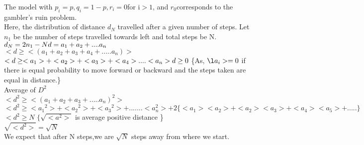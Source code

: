 \documentclass{beamer}
\providecommand{\brak}[1]{\ensuremath{\left(#1\right)}}
\providecommand{\brak}[1]{\ensuremath{\left(#1\right)}}
\begin{document}
            \begin{frame}
            The model with $ p_i=p,q_i=1-p,r_i=0 $for i$>1$, and $r_0 $corresponds to the gambler's ruin problem.\\
            
            Here, the distribution of distance $d_N$ travelled after a given number of steps. Let $n_1 $ be the number 
             of steps travelled towards left and total steps be N.\\
             $d_N=2n_1-N   \\
             d=a_1 +a_2 +....a_n $\\
             $<d \ge  < \brak {a_1 +a_2 +a_3 +a_4 +.....a_n}> $\\
            $ <d\ge   <a_1>+<a_2>+<a_3>+<a_4>....<a_n>\\
              d \ge 0  $ \hspace \{As, $ \l a_i>=0$ if there is equal probability to move forward or backward and the steps taken are equal in distance.\}\\
             Average of $D^2 $\\
             $<d^2\ge <\brak{ a_1+a_2+a_3+.....a_n  }^2> $\\
            $ <d^2\ge <{a_1}^2>+<{a_2}^2>+<{a_3}^2>+.......<a_n^2> +2 \{<a_1><a_2> +<a_2><a_3>+<a_4><a_5>+.....\} $\\
            $<d^2 \ge N  $   \hspace  $\{ \sqrt{<a^2>} $  is average positive distance \}  \\
             $\sqrt{<d^2>}= \sqrt{N}$\\
             We expect  that after N steps,we are  $\sqrt{N} $ steps away from where we start. \\

            \end{frame}
\end{document}

